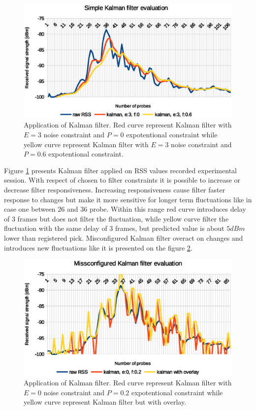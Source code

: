\documentclass[../main.tex]{subfiles}
\begin{document}
\begin{figure}[!htbp]
\includegraphics[width=\textwidth]{pictures/filtering_simple_kalman}
\centering
\caption{Application of Kalman filter. Red curve represent Kalman filter with $E=3$ noise constraint and $P=0$ expotentional constraint while yellow curve represent Kalman filter with $E=3$ noise constraint and $P=0.6$ expotentional constraint. }
\label{fig:filtering_simple_kalman}
\end{figure}

Figure \ref{fig:filtering_simple_kalman} presents Kalman filter applied on RSS values recorded experimental session. With respect of chosen to filter constraints it is possible to increase or decrease filter responsiveness. Increasing responsiveness cause filter faster response to changes but make it more sensitive for longer term fluctuations like in case one between $26$ and $36$ probe. Within this range red curve introduces delay of $3$ frames but does not filter the fluctuation, while yellow curve filter the fluctuation with the same delay of $3$ frames, but predicted value is about $5dBm$ lower than registered pick. Misconfigured Kalman filter overact on changes and introduces new fluctuations like it is presented on the figure \ref{fig:filtering_simple_kalman_missconfigured}.

\begin{figure}[!htbp]
\includegraphics[width=\textwidth]{pictures/filtering_simple_kalman_missconfigured}
\centering
\caption{Application of Kalman filter. Red curve represent Kalman filter with $E=0$ noise constraint and $P=0.2$ expotentional constraint while yellow curve represent Kalman filter but with overlay. }
\label{fig:filtering_simple_kalman_missconfigured}
\end{figure}
\end{document}
